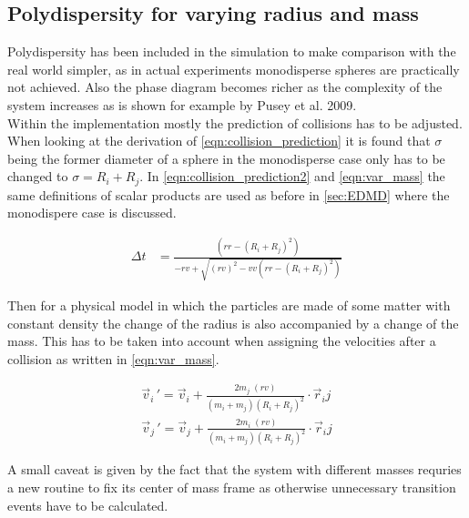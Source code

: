 \subsection{Polydispersity for varying radius and mass}
\label{sec:extension_radius}
Polydispersity has been included in the simulation to make comparison with the real world simpler, as in actual experiments monodisperse spheres are practically not achieved. Also the phase diagram becomes richer as the complexity of the system increases as is shown for example by Pusey et al. 2009\cite{Pusey2009}.\\ 
Within the implementation mostly the prediction of collisions has to be adjusted. When looking at the derivation of \autoref{eqn:collision_prediction} it is found that $\sigma$ being the former diameter of a sphere in the monodisperse case only has to be changed to $\sigma=R_i+R_j$. In \autoref{eqn:collision_prediction2} and \autoref{eqn:var_mass} the same definitions of scalar products are used as before in \autoref{sec:EDMD} where the monodispere case is discussed.

\begin{align}
\label{eqn:collision_prediction2}
\Delta t &= \frac{\left(rr - (R_i+R_j)^2 \right)}{ - rv + \sqrt{ (rv)^2  - vv \left(rr - (R_i+R_j)^2 \right)}}
\end{align} 

Then for a physical model in which the particles are made of some matter with constant density the change of the radius is also accompanied by a change of the mass. This has to be taken into account when assigning the velocities after a collision as written in \autoref{eqn:var_mass}.

\begin{align}
\label{eqn:var_mass}
\vec{v}_i{\,'} = \vec{v}_i + \frac{2 m_j \; (rv)}{(m_i + m_j) (R_i+R_j)^2} \cdot \vec{r}_ij \nonumber \\
\vec{v}_j{\,'} = \vec{v}_j + \frac{2 m_i \; (rv)}{(m_i + m_j) (R_i+R_j)^2} \cdot \vec{r}_ij
\end{align}

A small caveat is given by the fact that the system with different masses requries a new routine to fix its center of mass frame as otherwise unnecessary transition events have to be calculated.

